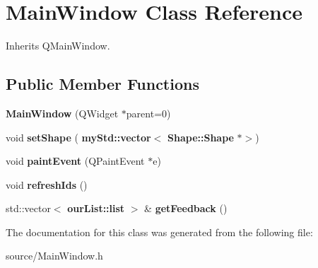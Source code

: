 \section{Main\+Window Class Reference}
\label{class_main_window}


Inherits Q\+Main\+Window.

\subsection*{Public Member Functions}
\begin{DoxyCompactItemize}
\item 
\mbox{\label{class_main_window_a8b244be8b7b7db1b08de2a2acb9409db}} 
{\bfseries Main\+Window} (Q\+Widget $\ast$parent=0)
\item 
\mbox{\label{class_main_window_a3dd6613826e5646e276522158365407b}} 
void {\bfseries set\+Shape} (\textbf{ my\+Std\+::vector}$<$ \textbf{ Shape\+::\+Shape} $\ast$$>$)
\item 
\mbox{\label{class_main_window_a7d17315ad42e624c7960b0c93fe4f0b9}} 
void {\bfseries paint\+Event} (Q\+Paint\+Event $\ast$e)
\item 
\mbox{\label{class_main_window_ab267c37da70d73ef8f3969b465548901}} 
void {\bfseries refresh\+Ids} ()
\item 
\mbox{\label{class_main_window_a11644a8bdb381550bf59e854ec17caba}} 
std\+::vector$<$ \textbf{ our\+List\+::list} $>$ \& {\bfseries get\+Feedback} ()
\end{DoxyCompactItemize}


The documentation for this class was generated from the following file\+:\begin{DoxyCompactItemize}
\item 
source/Main\+Window.\+h\end{DoxyCompactItemize}
